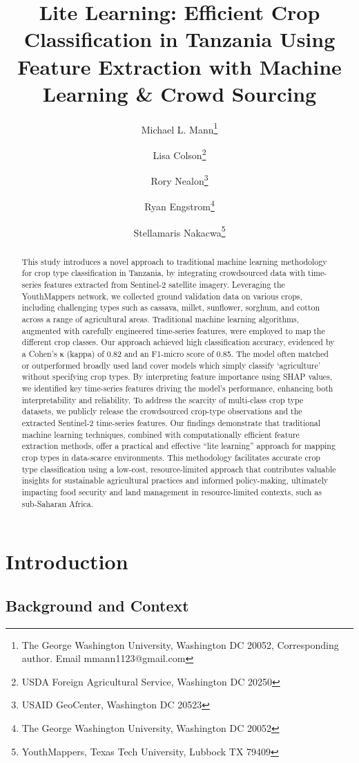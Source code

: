 \documentclass[
  journal,
  twocolumn]{IEEEtran}
\title{Lite Learning: Efficient Crop Classification in Tanzania Using
Feature Extraction with Machine Learning \& Crowd Sourcing}
\author{
Michael L. Mann\thanks{The George Washington University, Washington DC
20052, Corresponding author. Email mmann1123@gmail.com} \and 
Lisa Colson\thanks{USDA Foreign Agricultural Service, Washington DC
20250} \and 
Rory Nealon\thanks{USAID GeoCenter, Washington DC 20523} \and 
Ryan Engstrom\thanks{The George Washington University, Washington DC
20052} \and 
Stellamaris Nakacwa\thanks{YouthMappers, Texas Tech University, Lubbock
TX 79409}}
\date{}
\begin{document}
\maketitle
\begin{abstract}
This study introduces a novel approach to traditional machine learning
methodology for crop type classification in Tanzania, by integrating
crowdsourced data with time-series features extracted from Sentinel-2
satellite imagery. Leveraging the YouthMappers network, we collected
ground validation data on various crops, including challenging types
such as cassava, millet, sunflower, sorghum, and cotton across a range
of agricultural areas. Traditional machine learning algorithms,
augmented with carefully engineered time-series features, were employed
to map the different crop classes. Our approach achieved high
classification accuracy, evidenced by a Cohen's κ (kappa) of 0.82 and an
F1-micro score of 0.85. The model often matched or outperformed broadly
used land cover models which simply classify `agriculture' without
specifying crop types. By interpreting feature importance using SHAP
values, we identified key time-series features driving the model's
performance, enhancing both interpretability and reliability. To address
the scarcity of multi-class crop type datasets, we publicly release the
crowdsourced crop-type observations and the extracted Sentinel-2
time-series features. Our findings demonstrate that traditional machine
learning techniques, combined with computationally efficient feature
extraction methods, offer a practical and effective ``lite learning''
approach for mapping crop types in data-scarce environments. This
methodology facilitates accurate crop type classification using a
low-cost, resource-limited approach that contributes valuable insights
for sustainable agricultural practices and informed policy-making,
ultimately impacting food security and land management in
resource-limited contexts, such as sub-Saharan Africa.
\end{abstract}

\section{Introduction}\label{introduction}

\subsection{Background and Context}\label{background-and-context}
\end{document}
